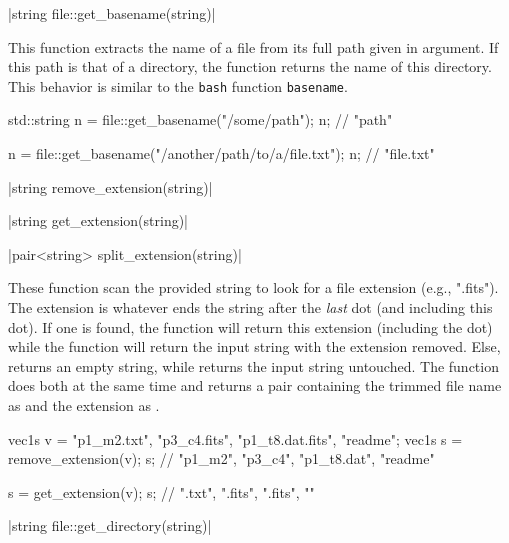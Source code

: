 \funcitem \vectorfunc \cppinline|string file::get_basename(string)| 

This function extracts the name of a file from its full path given in argument. If this path is that of a directory, the function returns the name of this directory. This behavior is similar to the \texttt{bash} function \texttt{basename}.

\begin{example}
\begin{cppcode}
std::string n = file::get_basename("/some/path");
n; // "path"

n = file::get_basename("/another/path/to/a/file.txt");
n; // "file.txt"
\end{cppcode}
\end{example}

\funcitem \vectorfunc \cppinline|string remove_extension(string)| 

\vectorfunc \cppinline|string get_extension(string)| 

\vectorfunc \cppinline|pair<string> split_extension(string)| 

These function scan the provided string to look for a file extension (e.g., ".fits"). The extension is whatever ends the string after the \emph{last} dot (and including this dot). If one is found, the function  will return this extension (including the dot) while the function  will return the input string with the extension removed. Else,  returns an empty string, while  returns the input string untouched. The function  does both at the same time and returns a pair containing the trimmed file name as  and the extension as .

\begin{example}
\begin{cppcode}
vec1s v = {"p1_m2.txt", "p3_c4.fits", "p1_t8.dat.fits", "readme"};
vec1s s = remove_extension(v);
s; // {"p1_m2", "p3_c4", "p1_t8.dat", "readme"}

s = get_extension(v);
s; // {".txt", ".fits", ".fits", ""}
\end{cppcode}
\end{example}


\funcitem \vectorfunc \cppinline|string file::get_directory(string)| 

